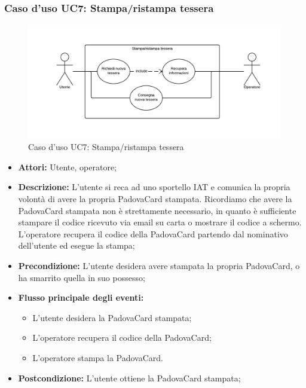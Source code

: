 \subsubsection{Caso d'uso UC7: Stampa/ristampa tessera}
\begin{figure}[H]
\centering
\includegraphics[width=1\textwidth]{images/UC7.png}
\caption{Caso d'uso UC7: Stampa/ristampa tessera}
\end{figure}
\begin{itemize}
\item \textbf{Attori:} Utente, operatore;
\item \textbf{Descrizione:} L'utente si reca ad uno sportello IAT e comunica la propria volontà di avere la propria PadovaCard stampata. Ricordiamo che avere la PadovaCard stampata non è strettamente necessario, in quanto è sufficiente stampare il codice ricevuto via email su carta o mostrare il codice a schermo. L'operatore recupera il codice della PadovaCard partendo dal nominativo dell'utente ed esegue la stampa;
\item \textbf{Precondizione:} L'utente desidera avere stampata la propria PadovaCard, o ha smarrito quella in suo possesso;
\item \textbf{Flusso principale degli eventi:}
	\begin{itemize}
    	\item L'utente desidera la PadovaCard stampata;
        \item L'operatore recupera il codice della PadovaCard;
        \item L'operatore stampa la PadovaCard.
    \end{itemize}
\item \textbf{Postcondizione:}  L'utente ottiene la PadovaCard stampata;
\end{itemize}

